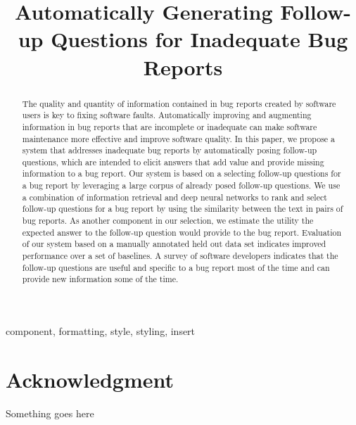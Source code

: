 \documentclass[10pt,conference]{IEEEtran}
\begin{document}
\title{Automatically Generating Follow-up Questions for Inadequate Bug Reports}

\author{
\and
{}
\and
{}
}

\maketitle

\begin{abstract}
The quality and quantity of information contained in bug reports created by software users is key
to fixing software faults.
%
%
Automatically improving and augmenting information in bug reports that are incomplete or
inadequate can make software maintenance more effective and improve software quality.
%
In this paper, we propose a system that addresses inadequate bug reports by automatically posing follow-up questions,
which are intended to elicit answers that add value and provide missing information to a bug report.
%
Our system is based on a selecting follow-up questions for a bug report by leveraging a large corpus of already posed follow-up questions.
%
We use a combination of information retrieval and deep neural networks to rank and select
follow-up questions for a bug report by using the similarity between the text in pairs of bug
reports.
%
As another component in our selection, we estimate the utility the expected answer to the follow-up question would provide
to the bug report.
%
Evaluation of our system based on a manually annotated held out data set indicates improved
performance over a set of baselines.
%
A survey of software developers indicates that the follow-up questions are useful and specific to a bug
report most of the time and can provide new information some of the time.

\end{abstract}

\begin{IEEEkeywords}
component, formatting, style, styling, insert
\end{IEEEkeywords}











\section*{Acknowledgment}

Something goes here



\end{document}
